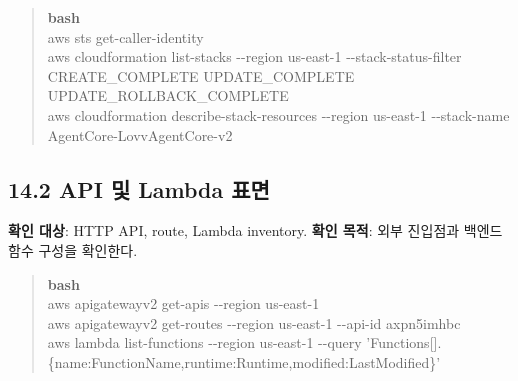 \documentclass[12pt,a4paper]{article}
\newcommand{\DocNeedspace}[1]{\par\ifdim\dimexpr\pagegoal-\pagetotal\relax<#1\newpage\fi}
\begin{document}
\begin{quote}
\begin{scriptsize}
\ttfamily
\RaggedRight
\setlength{\parskip}{1pt}
\textcolor{LovvGreen}{\textbf{bash}}\\[0.2em]
aws sts get-\allowbreak{}caller-\allowbreak{}identity\\
aws cloudformation list-\allowbreak{}stacks -\allowbreak{}-\allowbreak{}region us-\allowbreak{}east-\allowbreak{}1 -\allowbreak{}-\allowbreak{}stack-\allowbreak{}status-\allowbreak{}filter CREATE\_\allowbreak{}COMPLETE UPDATE\_\allowbreak{}COMPLETE UPDATE\_\allowbreak{}ROLLBACK\_\allowbreak{}COMPLETE\\
aws cloudformation describe-\allowbreak{}stack-\allowbreak{}resources -\allowbreak{}-\allowbreak{}region us-\allowbreak{}east-\allowbreak{}1 -\allowbreak{}-\allowbreak{}stack-\allowbreak{}name Agent\allowbreak{}Core-\allowbreak{}Lovv\allowbreak{}Agent\allowbreak{}Core-\allowbreak{}v2\\
\end{scriptsize}
\end{quote}


\DocNeedspace{12\baselineskip}
\subsection*{14.2 API 및 Lambda 표면}
\textbf{확인 대상}: HTTP API, route, Lambda inventory.\newline
\textbf{확인 목적}: 외부 진입점과 백엔드 함수 구성을 확인한다.

\begin{quote}
\begin{scriptsize}
\ttfamily
\RaggedRight
\setlength{\parskip}{1pt}
\textcolor{LovvGreen}{\textbf{bash}}\\[0.2em]
aws apigatewayv2 get-\allowbreak{}apis -\allowbreak{}-\allowbreak{}region us-\allowbreak{}east-\allowbreak{}1\\
aws apigatewayv2 get-\allowbreak{}routes -\allowbreak{}-\allowbreak{}region us-\allowbreak{}east-\allowbreak{}1 -\allowbreak{}-\allowbreak{}api-\allowbreak{}id axpn5imhbc\\
aws lambda list-\allowbreak{}functions -\allowbreak{}-\allowbreak{}region us-\allowbreak{}east-\allowbreak{}1 -\allowbreak{}-\allowbreak{}query 'Functions[].\{name:FunctionName,runtime:Runtime,modified:LastModified\}'\\
\end{scriptsize}
\end{quote}
\end{document}
